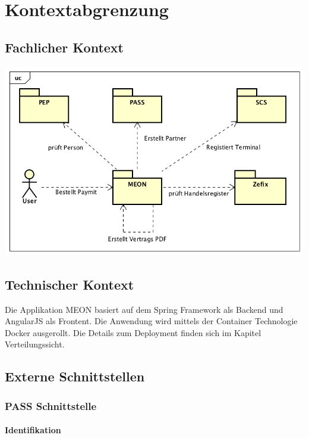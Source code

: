 \graphicspath{{./images/}}

\chapter{Kontextabgrenzung}

\section{Fachlicher Kontext}

\begin{center}
	\includegraphics[scale=0.7]{kontext.png}
\end{center}


\section{Technischer Kontext}

Die Applikation MEON basiert auf dem Spring Framework als Backend und AngularJS als Frontent. Die Anwendung wird mittels der Container Technologie Docker ausgerollt. Die Details zum Deployment finden sich im Kapitel Verteilungssicht.

\section{Externe Schnittstellen}

\subsection{PASS Schnittstelle}
		
\subsubsection{Identifikation}

